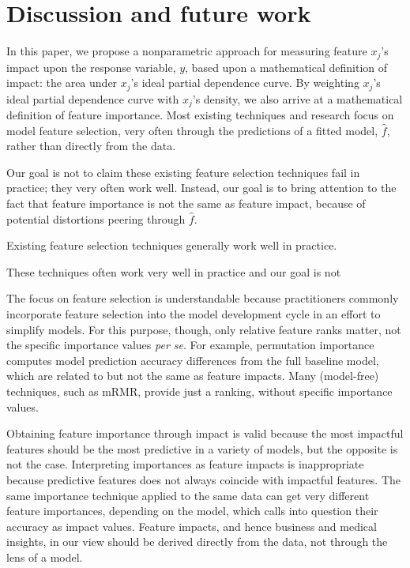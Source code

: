 \documentclass[11pt]{article}
\begin{document}
\section{Discussion and future work}\label{sec:discussion}

In this paper, we propose a nonparametric approach for measuring feature $x_j$'s impact upon the response variable, $y$, based upon a mathematical definition of impact: the area under $x_j$'s ideal partial dependence curve. By weighting $x_j$'s ideal partial dependence curve with $x_j$'s density, we also arrive at a mathematical definition of feature importance.  Most existing techniques and research focus on model feature selection, very often through the predictions of a fitted model, $\hat{f}$, rather than directly from the data.  

Our goal is not to claim these existing feature selection techniques fail in practice; they very often work well. Instead, our goal is to bring attention to the fact that feature importance is not the same as feature impact, because of potential distortions peering through $\hat{f}$.
 

Existing feature selection techniques generally work well in practice. 



These techniques often work very well in practice and our goal is not


The focus on feature selection is understandable because practitioners commonly incorporate feature selection into the model development cycle in an effort to simplify models. For this purpose, though, only relative feature ranks matter, not the specific importance values {\em per se}.  For example, permutation importance  computes model prediction accuracy differences from the full baseline model, which are related to but not the same as feature impacts. Many (model-free) techniques, such as mRMR, provide just a ranking, without specific importance values.

Obtaining feature importance through impact is valid because the most impactful features should be the most predictive in a variety of models, but the opposite is not the case.   Interpreting importances as feature impacts is inappropriate because predictive features does not always coincide with impactful features.  The same importance technique applied to the same data can get very different feature importances, depending on the model, which calls into question their accuracy as impact values.  Feature impacts, and hence business and medical insights,  in our view should be derived directly from the data, not through the lens of a model.
\end{document}
